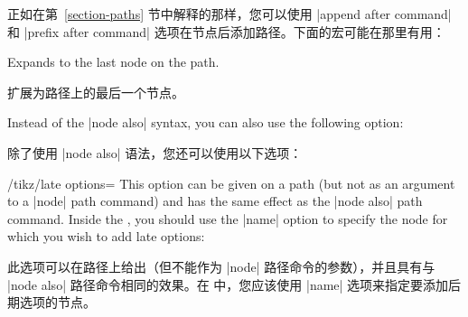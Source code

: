 正如在第~\ref{section-paths} 节中解释的那样，您可以使用 |append after command| 和 |prefix after command| 选项在节点后添加路径。下面的宏可能在那里有用：


\begin{command}{\tikzlastnode}
    Expands to the last node on the path.

    扩展为路径上的最后一个节点。


\end{command}

Instead of the |node also| syntax, you can also use the following option:

除了使用 |node also| 语法，您还可以使用以下选项：

\begin{key}{/tikz/late options=}
    This option can be given on a path (but not as an argument to a |node| path
    command) and has the same effect as the |node also| path command. Inside
    the , you should use the |name| option to specify the node
    for which you wish to add late options:
    
    此选项可以在路径上给出（但不能作为 |node| 路径命令的参数），并且具有与 |node also| 路径命令相同的效果。在  中，您应该使用 |name| 选项来指定要添加后期选项的节点。
\begin{codeexample}[]
\end{codeexample}
\end{key}


